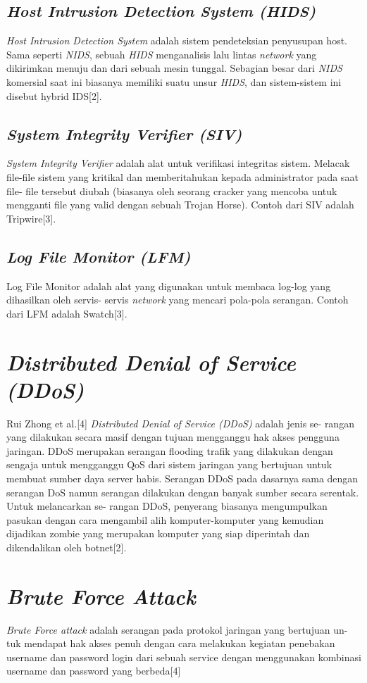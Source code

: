 \subsection{\emph{Host Intrusion Detection System (\emph{HIDS})}}
\emph{Host Intrusion Detection System} adalah sistem pendeteksian penyusupan host.
Sama seperti \emph{NIDS}, sebuah \emph{HIDS} menganalisis lalu lintas \emph{network} yang dikirimkan
menuju dan dari sebuah mesin tunggal. Sebagian besar dari \emph{NIDS} komersial saat ini
biasanya memiliki suatu unsur \emph{HIDS}, dan sistem-sistem ini disebut hybrid IDS[2].

\subsection{\emph{System Integrity Verifier (SIV)}}
\emph{System Integrity Verifier} adalah alat untuk verifikasi integritas sistem. Melacak
file-file sistem yang kritikal dan memberitahukan kepada administrator pada saat file-
file tersebut diubah (biasanya oleh seorang cracker yang mencoba untuk mengganti
file yang valid dengan sebuah Trojan Horse). Contoh dari SIV adalah Tripwire[3].

\subsection{\emph{Log File Monitor (LFM)}}
Log File Monitor adalah alat yang digunakan untuk membaca log-log yang
dihasilkan oleh servis- servis \emph{network} yang mencari pola-pola serangan. Contoh dari
LFM adalah Swatch[3].

\section{\emph{Distributed Denial of Service (DDoS)}}
Rui Zhong et al.[4] \emph{Distributed Denial of Service (DDoS)} adalah jenis se-
rangan yang dilakukan secara masif dengan tujuan mengganggu hak akses pengguna
jaringan. DDoS merupakan serangan flooding trafik yang dilakukan dengan sengaja
untuk mengganggu QoS dari sistem jaringan yang bertujuan untuk membuat sumber
daya server habis. Serangan DDoS pada dasarnya sama dengan serangan DoS namun
serangan dilakukan dengan banyak sumber secara serentak. Untuk melancarkan se-
rangan DDoS, penyerang biasanya mengumpulkan pasukan dengan cara mengambil
alih komputer-komputer yang kemudian dijadikan zombie yang merupakan komputer
yang siap diperintah dan dikendalikan oleh botnet[2].

\newpage 
\section{\emph{Brute Force Attack}}
\emph{Brute Force attack} adalah serangan pada protokol jaringan yang bertujuan un-
tuk mendapat hak akses penuh dengan cara melakukan kegiatan penebakan username
dan password login dari sebuah service dengan menggunakan kombinasi username
dan password yang berbeda[4] 


